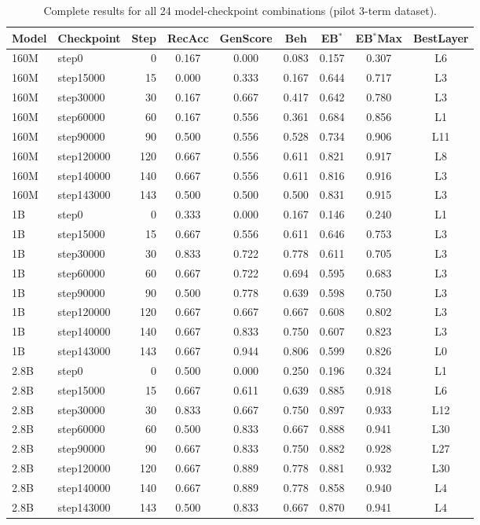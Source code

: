 \documentclass[10pt]{article} %
\begin{document}
\begin{table}[H]
\centering
\begin{tabular}{|l|l|r|c|c|c|c|c|c|}
\hline
\textbf{Model} & \textbf{Checkpoint} & \textbf{Step} & \textbf{RecAcc} & \textbf{GenScore} & \textbf{Beh} & \textbf{EB$^*$} & \textbf{EB$^*$Max} & \textbf{BestLayer} \\
\hline
160M & step0 & 0 & 0.167 & 0.000 & 0.083 & 0.157 & 0.307 & L6 \\
160M & step15000 & 15 & 0.000 & 0.333 & 0.167 & 0.644 & 0.717 & L3 \\
160M & step30000 & 30 & 0.167 & 0.667 & 0.417 & 0.642 & 0.780 & L3 \\
160M & step60000 & 60 & 0.167 & 0.556 & 0.361 & 0.684 & 0.856 & L1 \\
160M & step90000 & 90 & 0.500 & 0.556 & 0.528 & 0.734 & 0.906 & L11 \\
160M & step120000 & 120 & 0.667 & 0.556 & 0.611 & 0.821 & 0.917 & L8 \\
160M & step140000 & 140 & 0.667 & 0.556 & 0.611 & 0.816 & 0.916 & L3 \\
160M & step143000 & 143 & 0.500 & 0.500 & 0.500 & 0.831 & 0.915 & L3 \\
\hline
1B & step0 & 0 & 0.333 & 0.000 & 0.167 & 0.146 & 0.240 & L1 \\
1B & step15000 & 15 & 0.667 & 0.556 & 0.611 & 0.646 & 0.753 & L3 \\
1B & step30000 & 30 & 0.833 & 0.722 & 0.778 & 0.611 & 0.705 & L3 \\
1B & step60000 & 60 & 0.667 & 0.722 & 0.694 & 0.595 & 0.683 & L3 \\
1B & step90000 & 90 & 0.500 & 0.778 & 0.639 & 0.598 & 0.750 & L3 \\
1B & step120000 & 120 & 0.667 & 0.667 & 0.667 & 0.608 & 0.802 & L3 \\
1B & step140000 & 140 & 0.667 & 0.833 & 0.750 & 0.607 & 0.823 & L3 \\
1B & step143000 & 143 & 0.667 & 0.944 & 0.806 & 0.599 & 0.826 & L0 \\
\hline
2.8B & step0 & 0 & 0.500 & 0.000 & 0.250 & 0.196 & 0.324 & L1 \\
2.8B & step15000 & 15 & 0.667 & 0.611 & 0.639 & 0.885 & 0.918 & L6 \\
2.8B & step30000 & 30 & 0.833 & 0.667 & 0.750 & 0.897 & 0.933 & L12 \\
2.8B & step60000 & 60 & 0.500 & 0.833 & 0.667 & 0.888 & 0.941 & L30 \\
2.8B & step90000 & 90 & 0.667 & 0.833 & 0.750 & 0.882 & 0.928 & L27 \\
2.8B & step120000 & 120 & 0.667 & 0.889 & 0.778 & 0.881 & 0.932 & L30 \\
2.8B & step140000 & 140 & 0.667 & 0.889 & 0.778 & 0.858 & 0.940 & L4 \\
2.8B & step143000 & 143 & 0.500 & 0.833 & 0.667 & 0.870 & 0.941 & L4 \\
\hline
\end{tabular}%

\caption{Complete results for all 24 model-checkpoint combinations (pilot 3-term dataset).}
\label{tab:a1a_pilot}
\end{table}
\end{document}
